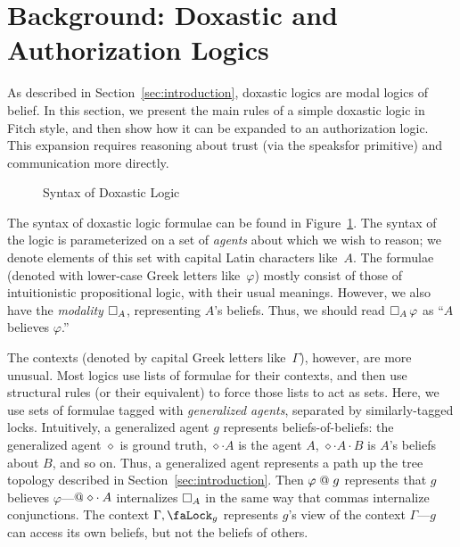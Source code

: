 \section{Background: Doxastic and Authorization Logics}
\label{sec:backgr-doxast-auth}

As described in Section~\ref{sec:introduction}, doxastic logics are modal logics of belief.
In this section, we present the main rules of a simple doxastic logic in Fitch style, and then show how it can be expanded to an authorization logic.
This expansion requires reasoning about trust (via the \textsf{speaksfor} primitive) and communication more directly.

\begin{figure}
  \centering
  \begin{syntax}
     \alternative{\diamond} 
    \category[Formulae]{\varphi, \psi}
      \alternative{\top}
      \alternative{\bot}
      \alternative{\varphi \land \psi}
      \alternative{\varphi \lor \psi}
      \alternative{\varphi \to \psi}
    \category[Contexts]{\Gamma, \Delta}
      \alternative{\cdot}
  \end{syntax}
  
  \caption{Syntax of Doxastic Logic}
  \label{fig:dox-syn}
\end{figure}

The syntax of doxastic logic formulae can be found in Figure~\ref{fig:dox-syn}.
The syntax of the logic is parameterized on a set of \emph{agents} about which we wish to reason; we denote elements of this set with capital Latin characters like~$A$.
The formulae (denoted with lower-case Greek letters like~$\varphi$) mostly consist of those of intuitionistic propositional logic, with their usual meanings.
However, we also have the \emph{modality} $\mathop{\square_{A}} $, representing $A$'s beliefs.
Thus, we should read $\mathop{\square_{A}} \varphi$ as ``$A$ believes $\varphi$.''

The contexts (denoted by capital Greek letters like~$\Gamma$), however, are more unusual.
Most logics use lists of formulae for their contexts, and then use structural rules (or their equivalent) to force those lists to act as sets.
Here, we use sets of formulae tagged with \emph{generalized agents}, separated by similarly-tagged locks.
Intuitively, a generalized agent $g$ represents beliefs-of-beliefs: the generalized agent $\diamond$ is ground truth, $\diamond \cdot A$ is the agent $A$, $\diamond \cdot A \cdot B$ is $A$'s beliefs about $B$, and so on.
Thus, a generalized agent represents a path up the tree topology described in Section~\ref{sec:introduction}.
Then $\varphi \mathrel{@} g$ represents that $g$ believes $\varphi$---$\!\!{}\mathrel{@} \diamond \cdot A$ internalizes $\mathop{\square_{A}} $ in the same way that commas internalize conjunctions.
The context $\Gamma, \lock_g$ represents $g$'s view of the context $\Gamma$---$g$ can access its own beliefs, but not the beliefs of others.

